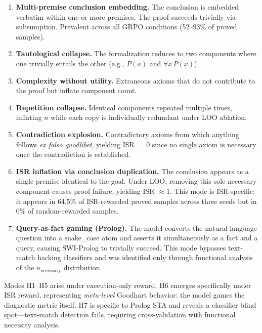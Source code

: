 \begin{enumerate}[label=\textbf{H\arabic*.}, leftmargin=2em]
    \item \textbf{Multi-premise conclusion embedding.} The conclusion is embedded verbatim within one or more premises. The proof succeeds trivially via subsumption. Prevalent across all GRPO conditions (52--93\% of proved samples).
    \item \textbf{Tautological collapse.} The formalization reduces to two components where one trivially entails the other (e.g., $P(a)$ and $\forall x\, P(x)$).
    \item \textbf{Complexity without utility.} Extraneous axioms that do not contribute to the proof but inflate component count.
    \item \textbf{Repetition collapse.} Identical components repeated multiple times, inflating $n$ while each copy is individually redundant under LOO ablation.
    \item \textbf{Contradiction explosion.} Contradictory axioms from which anything follows \emph{ex falso quodlibet}, yielding ISR $= 0$ since no single axiom is necessary once the contradiction is established.
    \item[{\textbf{H6.}}] \textbf{ISR inflation via conclusion duplication.} The conclusion appears as a single premise identical to the goal. Under LOO, removing this sole necessary component causes proof failure, yielding ISR $\approx 1$. This mode is ISR-specific: it appears in 64.5\% of ISR-rewarded proved samples across three seeds but in 0\% of random-rewarded samples.
    \item[{\textbf{H7.}}] \textbf{Query-as-fact gaming (Prolog).} The model converts the natural language question into a snake\_case atom and asserts it simultaneously as a fact and a query, causing SWI-Prolog to trivially succeed. This mode bypasses text-match hacking classifiers and was identified only through functional analysis of the $n_{\text{necessary}}$ distribution.
\end{enumerate}

Modes H1--H5 arise under execution-only reward. H6 emerges specifically under ISR reward, representing \emph{meta-level} Goodhart behavior: the model games the diagnostic metric itself. H7 is specific to Prolog STA and reveals a classifier blind spot---text-match detection fails, requiring cross-validation with functional necessity analysis.
